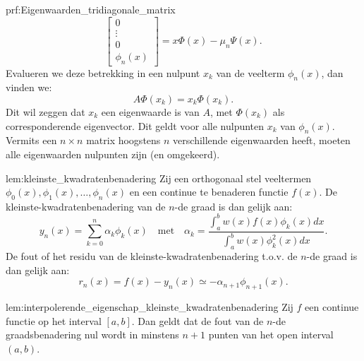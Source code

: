 \begin{prf}{prf:Eigenwaarden_tridiagonale_matrix}
\begin{equation*}
\begin{bmatrix}
            0 \\
            \vdots \\
            0 \\
            \phi_{n}(x)
        \end{bmatrix}
        = x\Phi(x) - \mu_n\Psi(x).
    \end{equation*}
    Evalueren we deze betrekking in een nulpunt $x_k$ van de veelterm $\phi_n(x)$, dan vinden we:
    \begin{equation*}
        A\Phi(x_k) = x_k\Phi(x_k).
    \end{equation*}
    Dit wil zeggen dat $x_k$ een eigenwaarde is van $A$, met $\Phi(x_k)$ als corresponderende eigenvector. Dit geldt voor alle nulpunten $x_k$ van $\phi_n(x)$. Vermits een $n \times n $ matrix hoogstens $n$ verschillende eigenwaarden heeft, moeten alle eigenwaarden nulpunten zijn (en omgekeerd).
\end{prf}

\newpage

\begin{lem}{lem:kleinste_kwadratenbenadering}
    Zij een orthogonaal stel veeltermen $\phi_0(x), \phi_1(x), \ldots, \phi_n(x)$ en een continue te benaderen functie $f(x)$. De kleinste-kwadratenbenadering van de $n$-de graad is dan gelijk aan:
    \begin{equation*}
        y_n(x) = \sum_{k=0}^n \alpha_k\phi_k(x) \quad \text{met} \quad \alpha_k = \frac{\int_a^b w(x)f(x)\phi_k(x)dx}{\int_a^b w(x) \phi_k^2(x)dx}.
    \end{equation*}
    De fout of het residu van de kleinste-kwadratenbenadering t\@.o\@.v\@. de $n$-de graad is dan gelijk aan:
    \begin{equation*}
        r_n(x) = f(x) - y_n(x) \simeq -\alpha_{n+1}\phi_{n+1}(x).
    \end{equation*}
\end{lem}

\begin{lem}{lem:interpolerende_eigenschap_kleinste_kwadratenbenadering}
    Zij $f$ een continue functie op het interval $[a,b]$. Dan geldt dat de fout van de $n$-de graadsbenadering nul wordt in minstens $n+1$ punten van het open interval $(a,b)$.
\end{lem}

